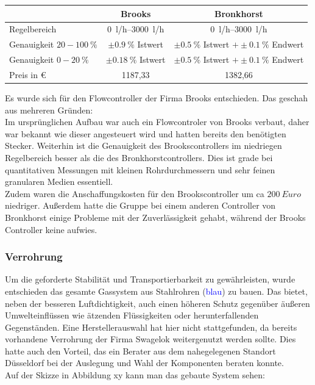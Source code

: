 \begin{tabular}{|l|c|c|}
	\hline  & Brooks & Bronkhorst \\ 
	\hline Regelbereich & \SIrange{0}{3000}{l/h} & \SIrange{0}{3000}{l/h} \\ 
	\hline Genauigkeit $20 - \SI{100}{\%}$ & $\pm \SI{0,9}{\%}$ Istwert & $\pm \SI{0,5}{\%}$ Istwert $+ \pm \SI{0,1}{\%}$ Endwert\\ 
	\hline Genauigkeit $0 - \SI{20}{\%}$ & $\pm \SI{0,18}{\%}$ Istwert & $\pm \SI{0,5}{\%}$ Istwert $+ \pm \SI{0,1}{\%}$ Endwert \\ 
	\hline Preis in \euro & 1187,33 & 1382,66 \\ 
	\bottomrule 
\end{tabular} 

\vspace{0,5cm}

Es wurde sich für den Flowcontroller der Firma Brooks entschieden. Das geschah aus mehreren Gründen: \\
Im ursprünglichen Aufbau war auch ein Flowcontroler von Brooks verbaut, daher war bekannt wie dieser angesteuert wird und hatten bereits den benötigten Stecker. Weiterhin ist die Genauigkeit des Brookscontrollers im niedriegen Regelbereich besser als die des Bronkhorstcontrollers. Dies ist grade bei quantitativen Messungen mit kleinen Rohrdurchmessern und sehr feinen granularen Medien essentiell. \\
Zudem waren die Anschaffungskosten für den Brookscontroller um ca $\SI{200}{Euro}$ niedriger. Außerdem hatte die Gruppe bei einem anderen Controller von Bronkhorst einige Probleme mit der Zuverlässigkeit gehabt, während der Brooks Controller keine aufwies.


\subsubsection{Verrohrung}

Um die geforderte Stabilität und Transportierbarkeit zu gewährleisten, wurde entschieden das gesamte Gassystem aus Stahlrohren (\textcolor{blue}{blau}) zu bauen. Das bietet, neben der besseren Luftdichtigkeit, auch einen höheren Schutz gegenüber äußeren Umwelteinflüssen wie ätzenden Flüssigkeiten oder herunterfallenden Gegenständen.
Eine Herstellerauswahl hat hier nicht stattgefunden, da bereits vorhandene Verrohrung der Firma Swagelok weitergenutzt werden sollte. Dies hatte auch den Vorteil, das ein Berater aus dem nahegelegenen Standort Düsseldorf bei der Auslegung und Wahl der Komponenten beraten konnte. \\
Auf der Skizze in Abbildung xy kann man das gebaute System sehen:
\hfill \\

